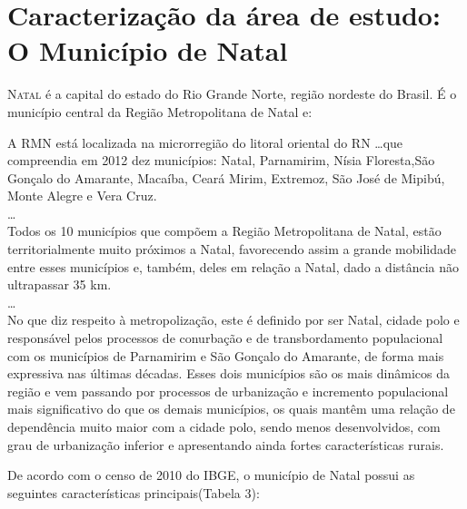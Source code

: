 \documentclass[
	12pt,				%
	openright,			%
	twoside,			%
	a4paper,			%
	chapter=TITLE,		%
	section=TITLE,		%
	subsection=TITLE,	%
	subsubsection=TITLE,%
	spanish,            %
	english,			%
	brazil				%
	]{abntex2}
\begin{document}
\section{Caracterização da área de estudo: O Município de Natal}

\lettrine[lines=2, lhang=0.33, loversize=0.25]{N}{atal} é a capital do estado do Rio Grande Norte, região nordeste do Brasil. É o município central da Região Metropolitana de Natal e:
\begin{citacao}
A RMN está localizada na microrregião do litoral oriental do RN \ldots  que compreendia em 2012 dez municípios: Natal, Parnamirim, Nísia Floresta,São Gonçalo do Amarante, Macaíba, Ceará Mirim, Extremoz, São José de Mipibú, Monte Alegre e Vera Cruz.\\
\ldots\\
Todos os 10 municípios que compõem a Região Metropolitana de Natal, estão territorialmente muito próximos a Natal, favorecendo assim a grande mobilidade  entre esses municípios e, também, deles em relação a Natal, dado a distância não ultrapassar 35 km.\\
\ldots\\
No que diz respeito à metropolização, este é definido por ser Natal, cidade polo e responsável pelos processos de conurbação e de transbordamento populacional com os municípios de Parnamirim e São Gonçalo do Amarante, de forma mais expressiva  nas últimas décadas. Esses dois municípios são os mais dinâmicos  da região e vem passando por processos de urbanização e incremento populacional  mais significativo do que os demais municípios, os quais mantêm uma relação  de dependência muito maior com a cidade polo, sendo menos desenvolvidos, com grau de urbanização inferior e apresentando ainda fortes características rurais. \cite[p. ~29-31]{Pessoa}
\end{citacao}

De acordo com o censo de 2010 do IBGE, o município de Natal possui as seguintes características principais(Tabela 3):
\end{document}
